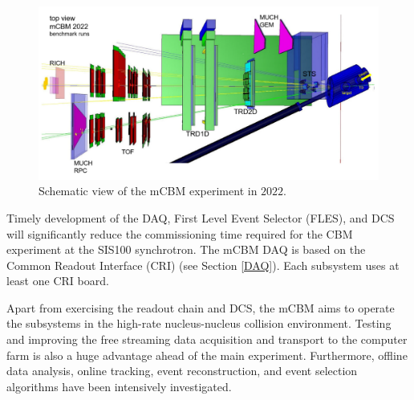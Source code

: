 \begin{figure}[!h]
\centering
\includegraphics[width=1\columnwidth]{Chapter6/DCS/images/mcbm_2021_setup.png}
\caption{Schematic view of the mCBM experiment in $2022$.}
\label{fig_mcbm}
\end{figure}
\newpage
Timely development of the \gls{DAQ}, First Level Event Selector (\gls{FLES}), and \gls{DCS} will significantly reduce the commissioning time required for the \gls{CBM} experiment at the SIS100 synchrotron. The \gls{mCBM} \gls{DAQ} is based on the Common Readout Interface (\gls{CRI}) (see Section \ref{DAQ}). Each subsystem uses at least one \gls{CRI} board. 

Apart from exercising the readout chain and \gls{DCS}, the \gls{mCBM} aims to operate the subsystems in the high-rate nucleus-nucleus collision environment. Testing and improving the free streaming data acquisition and transport to the computer farm is also a huge advantage ahead of the main experiment. Furthermore, offline data analysis, online tracking, event reconstruction, and event selection algorithms have been intensively investigated. 

